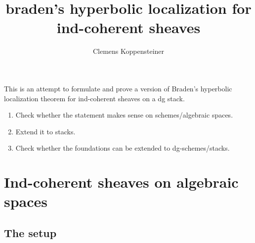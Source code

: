 \documentclass[english]{short-notes}
\title{braden's hyperbolic localization for ind-coherent sheaves}
\author{Clemens Koppensteiner}
\begin{document}
\maketitle

This is an attempt to formulate and prove a version of Braden's hyperbolic localization theorem \cite{Braden:2003:HyperbolicLocalizationOfIC, DrinfeldGaitsgory:arXiv:OnATheoremOfBraden} for ind-coherent sheaves on a dg stack.

\begin{enumerate}
    \item Check whether the statement makes sense on schemes/algebraic spaces.
    \item Extend it to stacks.
    \item Check whether the foundations can be extended to dg-schemes/stacks.
\end{enumerate}

\section{Ind-coherent sheaves on algebraic spaces}

\subsection{The setup}
\end{document}
